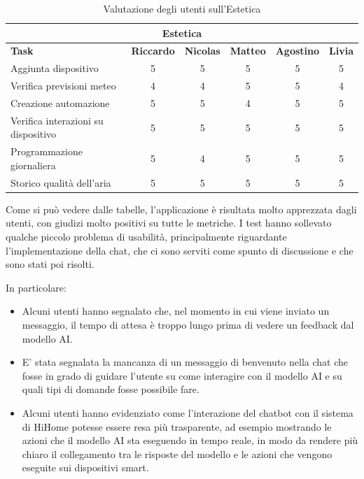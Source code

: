 \documentclass[a4paper,12pt]{article}
\begin{document}
\begin{table}[h!]
\centering
\begin{tabular}{|l|c|c|c|c|c|}
\hline
\multicolumn{6}{|c|}{\textbf{Estetica}} \\ \hline
\textbf{Task} & \textbf{Riccardo} & \textbf{Nicolas} & \textbf{Matteo} & \textbf{Agostino} & \textbf{Livia} \\ \hline
Aggiunta dispositivo & 5 & 5 & 5 & 5 & 5 \\ \hline
Verifica previsioni meteo & 4 & 4 & 5 & 5 & 4 \\ \hline
Creazione automazione & 5 & 5 & 4 & 5 & 5 \\ \hline
Verifica interazioni su dispositivo & 5 & 5 & 5 & 5 & 5 \\ \hline
Programmazione giornaliera & 5 & 4 & 5 & 5 & 5 \\ \hline
Storico qualità dell'aria & 5 & 5 & 5 & 5 & 5 \\ \hline
\end{tabular}
\caption{Valutazione degli utenti sull'Estetica}
\end{table}

Come si può vedere dalle tabelle, l'applicazione è risultata molto apprezzata dagli utenti, con giudizi molto positivi su tutte le metriche. I test hanno sollevato qualche piccolo problema di usabilità, principalmente riguardante l'implementazione della chat, che ci sono serviti come spunto di discussione e che sono stati poi risolti.

In particolare:
\begin{itemize}
    \item Alcuni utenti hanno segnalato che, nel momento in cui viene inviato un messaggio, il tempo di attesa è troppo lungo prima di vedere un feedback dal modello AI.
    \item E' stata segnalata la mancanza di un messaggio di benvenuto nella chat che fosse in grado di guidare l'utente su come interagire con il modello AI e su quali tipi di domande fosse possibile fare.
    \item Alcuni utenti hanno evidenziato come l'interazione del chatbot con il sistema di HiHome potesse essere resa più trasparente, ad esempio mostrando le azioni che il modello AI sta eseguendo in tempo reale, in modo da rendere più chiaro il collegamento tra le risposte del modello e le azioni che vengono eseguite sui dispositivi smart.
\end{itemize}
\end{document}
